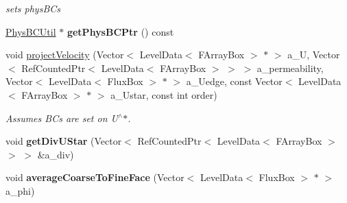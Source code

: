 \begin{DoxyCompactItemize}
\begin{DoxyCompactList}\small\item\em sets phys\-B\-Cs \end{DoxyCompactList}\item 
\hypertarget{class_c_c_projector_comp_a3edde7960454718c27494181ca97dad5}{\hyperlink{class_phys_b_c_util}{Phys\-B\-C\-Util} $\ast$ {\bfseries get\-Phys\-B\-C\-Ptr} () const }\label{class_c_c_projector_comp_a3edde7960454718c27494181ca97dad5}

\item 
\hypertarget{class_c_c_projector_comp_ae42cf073f90b30cb728f67369546d552}{void \hyperlink{class_c_c_projector_comp_ae42cf073f90b30cb728f67369546d552}{project\-Velocity} (Vector$<$ Level\-Data$<$ F\-Array\-Box $>$ $\ast$ $>$ a\-\_\-\-U, Vector$<$ Ref\-Counted\-Ptr$<$ Level\-Data$<$ F\-Array\-Box $>$ $>$ $>$ a\-\_\-permeability, Vector$<$ Level\-Data$<$ Flux\-Box $>$ $\ast$ $>$ a\-\_\-\-Uedge, const Vector$<$ Level\-Data$<$ F\-Array\-Box $>$ $\ast$ $>$ a\-\_\-\-Ustar, const int order)}\label{class_c_c_projector_comp_ae42cf073f90b30cb728f67369546d552}

\begin{DoxyCompactList}\small\item\em Assumes B\-Cs are set on U$^\wedge$$\ast$. \end{DoxyCompactList}\item 
\hypertarget{class_c_c_projector_comp_a56ca256ad54a85e7078b2e41c74cb1c2}{void {\bfseries get\-Div\-U\-Star} (Vector$<$ Ref\-Counted\-Ptr$<$ Level\-Data$<$ F\-Array\-Box $>$ $>$ $>$ \&a\-\_\-div)}\label{class_c_c_projector_comp_a56ca256ad54a85e7078b2e41c74cb1c2}

\item 
\hypertarget{class_c_c_projector_comp_a7614a43de1ea45c5d68954e64d252ba9}{void {\bfseries average\-Coarse\-To\-Fine\-Face} (Vector$<$ Level\-Data$<$ Flux\-Box $>$ $\ast$ $>$ a\-\_\-phi)}\label{class_c_c_projector_comp_a7614a43de1ea45c5d68954e64d252ba9}

\end{DoxyCompactItemize}
